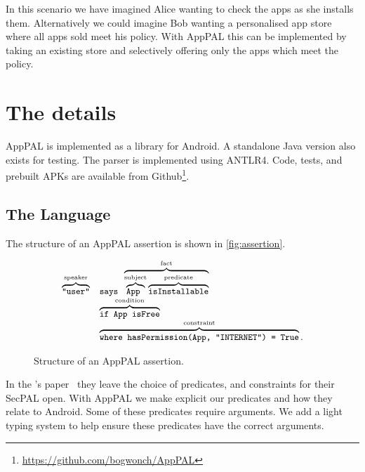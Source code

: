 \documentclass[a4paper]{scrartcl}
\newcommand{\comment}[1]{}%
\begin{document}
In this scenario we have imagined Alice wanting to check the apps as she installs them.
Alternatively we could imagine Bob wanting a personalised app store where all apps sold meet his policy.
With AppPAL this can be implemented by taking an existing store and selectively offering only the apps which meet the policy.


\section{The details \comment{5 pages}}
\label{sec:details}

AppPAL is implemented as a library for Android. 
A standalone Java version also exists for testing.  
The parser is implemented using ANTLR4.
Code, tests, and prebuilt APKs are available from Github\footnote{\url{https://github.com/bogwonch/AppPAL}}.

\subsection{The Language}
\label{ssec:language}

The structure of an AppPAL assertion is shown in \autoref{fig:assertion}.

\begin{figure}
  \centering
  \begin{equation*}\small
    \begin{array}{r l}
      \overbrace{\text{\ttfamily "user"}}^{\text{speaker}} & 
      \text{\ttfamily says }\overbrace{\overbrace{\text{\ttfamily App }}^{\text{subject}}\overbrace{\text{\ttfamily isInstallable}}^{\text{predicate}}}^{\text{fact}} \\
      & \overbrace{\text{\ttfamily if App isFree}}^{\text{condition}} \\
      & \overbrace{\text{\ttfamily where hasPermission(App, "INTERNET") = True}}^{\text{constraint}}. 
    \end{array}
  \end{equation*}
  \caption{Structure of an AppPAL assertion.}
\label{fig:assertion}
\end{figure}

In the \citeauthor{Becker:2006vh}'s paper~\citep{Becker:2006vh} they leave the choice of predicates, and constraints for their SecPAL open.
With AppPAL we make explicit our predicates and how they relate to Android.  
Some of these predicates require arguments.
We add a light typing system to help ensure these predicates have the correct arguments.
\end{document}
